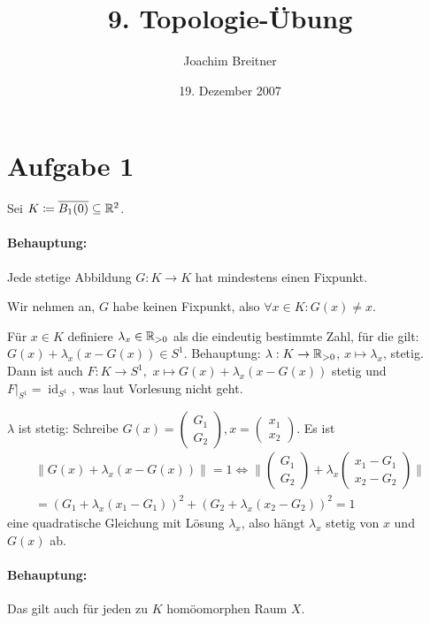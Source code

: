 \documentclass{article}
\title{9. Topologie-Übung}
\author{Joachim Breitner}
\date{19. Dezember 2007}
\begin{document}
\maketitle
\section*{Aufgabe 1}

Sei $K\mathrel{\mbox{$\coloneqq$}} \overline{B_1(0)} \subseteq \mathbb{R}^2$.

\paragraph{Behauptung:} Jede stetige Abbildung $G:K\to K$ hat mindestens einen Fixpunkt.

Wir nehmen an, $G$ habe keinen Fixpunkt, also $\forall x\in K: G(x)\ne x$.

Für $x\in K$ definiere $\lambda_x\in \mathbb{R}_{>0}$ als die eindeutig bestimmte Zahl, für die gilt: $G(x)+\lambda_x(x-G(x))\in S^1$. Behauptung: $\lambda: K\to \mathbb{R}_{>0}$, $x\mapsto \lambda_x$, stetig. Dann ist auch $F: K\to S^1,$ $x\mapsto G(x)+\lambda_x(x-G(x))$ stetig und $F|_{S^1}=\operatorname{id}_{S^1}$, was laut Vorlesung nicht geht.

$\lambda$ ist stetig: Schreibe $G(x) = 
(\begin{smallmatrix}
G_1\\G_2
\end{smallmatrix}), x=
(\begin{smallmatrix}
x_1\\x_2
\end{smallmatrix})$. Es ist
\begin{multline*}
\|G(x)+\lambda_x(x-G(x))\|=1 \iff \|
\begin{pmatrix}
G_1\\G_2
\end{pmatrix} +
\lambda_x\begin{pmatrix}
x_1 - G_1 \\
x_2 - G_2
\end{pmatrix}\|
\\= (G_1+\lambda_x(x_1-G_1))^2 + (G_2 + \lambda_x(x_2-G_2))^2 = 1
\end{multline*}
eine quadratische Gleichung mit Lösung $\lambda_x$, also hängt $\lambda_x$ stetig von $x$ und $G(x)$ ab.


\paragraph{Behauptung:} Das gilt auch für jeden zu $K$ homöomorphen Raum $X$.
\end{document}
